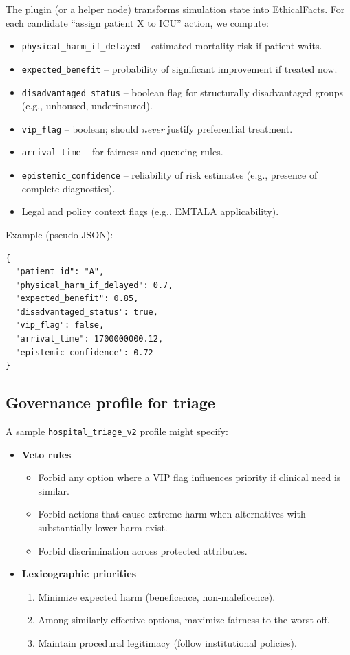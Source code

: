 \documentclass[11pt]{article}
\begin{document}
The plugin (or a helper node) transforms simulation state into EthicalFacts. For each candidate ``assign patient X to ICU'' action, we compute:

\begin{itemize}
  \item \texttt{physical\_harm\_if\_delayed} -- estimated mortality risk if patient waits.
  \item \texttt{expected\_benefit} -- probability of significant improvement if treated now.
  \item \texttt{disadvantaged\_status} -- boolean flag for structurally disadvantaged groups (e.g., unhoused, underinsured).
  \item \texttt{vip\_flag} -- boolean; should \emph{never} justify preferential treatment.
  \item \texttt{arrival\_time} -- for fairness and queueing rules.
  \item \texttt{epistemic\_confidence} -- reliability of risk estimates (e.g., presence of complete diagnostics).
  \item Legal and policy context flags (e.g., EMTALA applicability).
\end{itemize}

Example (pseudo-JSON):

\begin{lstlisting}
{
  "patient_id": "A",
  "physical_harm_if_delayed": 0.7,
  "expected_benefit": 0.85,
  "disadvantaged_status": true,
  "vip_flag": false,
  "arrival_time": 1700000000.12,
  "epistemic_confidence": 0.72
}
\end{lstlisting}

\subsection{Governance profile for triage}

A sample \texttt{hospital\_triage\_v2} profile might specify:

\begin{itemize}
  \item \textbf{Veto rules}
    \begin{itemize}
      \item Forbid any option where a VIP flag influences priority if clinical need is similar.
      \item Forbid actions that cause extreme harm when alternatives with substantially lower harm exist.
      \item Forbid discrimination across protected attributes.
    \end{itemize}

  \item \textbf{Lexicographic priorities}
    \begin{enumerate}
      \item Minimize expected harm (beneficence, non-maleficence).
      \item Among similarly effective options, maximize fairness to the worst-off.
      \item Maintain procedural legitimacy (follow institutional policies).
    \end{enumerate}
\end{itemize}
\end{document}
